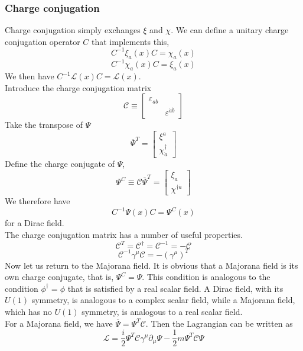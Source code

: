 \subsubsection{Charge conjugation}
\noindent
Charge conjugation simply exchanges $\xi$ and $\chi$. We can define a unitary charge conjugation operator $C$ that implements this,
\[C^{-1}\xi_a(x)C = \chi_a(x)\]
\[C^{-1}\chi_a(x)C = \xi_a(x)\]
We then have $C^{-1}\mathcal{L}(x)C = \mathcal{L}(x)$.\\
Introduce the charge conjugation matrix
\[\mathcal{C} \equiv \left[ \begin{matrix} \varepsilon_{ab}& \\ & \varepsilon ^{\dot{a}\dot{b}}\end{matrix} \right]\]
Take the transpose of $\Psi$
\[\overline{\Psi}^T = \left[ \begin{matrix} \xi^a\\ \chi_{\dot{a}}^{\dagger}\end{matrix} \right] \]
Define the charge conjugate of $\Psi$,
\[\Psi^C \equiv \mathcal{C}\overline{\Psi}^T = \left[ \begin{matrix} \xi_a\\ \chi^{\dagger \dot{a}}\end{matrix} \right] \]
We therefore have
\[C^{-1}\Psi(x)C = \Psi^C(x)\]
for a Dirac field.\\
The charge conjugation matrix has a number of useful properties.
\[\mathcal{C}^T = \mathcal{C}^{\dagger} = \mathcal{C}^{-1} = -\mathcal{C}\]
\[\mathcal{C}^{-1} \gamma^{\mu} \mathcal{C} = - (\gamma^{\mu})^T\]
Now let us return to the Majorana field. It is obvious that a Majorana field is its own charge conjugate, that is, $\Psi^C = \Psi$. This condition is analogous to the condition $\phi^{\dagger} = \phi$ that is satisfied by a real scalar field. A Dirac field, with its $U(1)$ symmetry, is analogous to a complex scalar field, while a Majorana field, which has no $U(1)$ symmetry, is analogous to a real scalar field.\\
For a Majorana field, we have $\overline{\Psi} = \Psi^T \mathcal{C}$. Then the Lagrangian can be written as
\[\mathcal{L} = \frac{i}{2} \Psi^T \mathcal{C} \gamma^{\mu} \partial_{\mu} \Psi - \frac{1}{2}m \Psi^T \mathcal{C} \Psi\]

